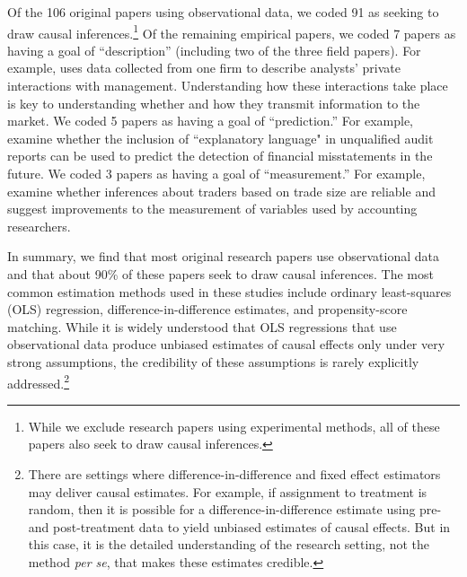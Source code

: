\documentclass[12pt,reqno,titlepage]{amsart}
\theoremstyle{definition}
\begin{document}
\begin{doublespace}
Of the 106 original papers using observational data, we coded 91 as seeking to draw causal inferences.\footnote{While we exclude research papers using experimental methods, all of these papers also seek to draw causal inferences.}
Of the remaining empirical papers, we coded 7 papers as having a goal of ``description'' (including two of the three field papers). 
For example, \citet{Soltes:2013ba} uses data collected from one firm to describe analysts' private interactions with management. Understanding how these interactions take place is key to understanding whether and how they transmit information to the market.
We coded 5 papers as having a goal of ``prediction.'' 
For example, \citet{Czerney:2014bv} examine whether the inclusion of ``explanatory language" in unqualified audit reports can be used to predict the detection of financial misstatements in the future.
We coded 3 papers as having a goal of ``measurement.'' 
For example, \citet{Cready:2014ji} examine whether inferences about traders based on trade size are reliable and suggest improvements to the measurement of variables used by accounting researchers.

In summary, we find that most original research papers use observational data and that about 90\% of these papers seek to draw causal inferences.
The most common estimation methods used in these studies include ordinary least-squares (OLS) regression, difference-in-difference estimates, and propensity-score matching.
While it is widely understood that OLS regressions that use observational data produce unbiased estimates of causal effects only under very strong assumptions, the credibility of these assumptions is rarely explicitly addressed.\footnote{
There are settings where difference-in-difference and fixed effect estimators may deliver causal estimates.
For example, if assignment to treatment is random, then it is possible for a difference-in-difference estimate using pre- and post-treatment data to yield unbiased estimates of causal effects.
But in this case, it is the detailed understanding of the research setting, not the method \emph{per se}, that makes these estimates credible.}


\end{doublespace}
\end{document}
